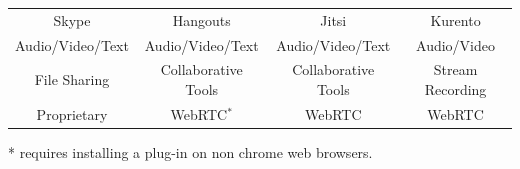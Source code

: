 \documentclass[compress]{beamer}
\begin{document}
\begin{frame}[c]
\begin{table}[]
\begin{tabular}{cccc}
Skype & Hangouts & Jitsi & Kurento   \\
\tiny Audio/Video/Text & \tiny Audio/Video/Text & \tiny Audio/Video/Text & \tiny Audio/Video  \\
\tiny File Sharing & \tiny Collaborative Tools & \tiny Collaborative Tools & \tiny Stream Recording \\
\tiny Proprietary & \tiny WebRTC$^{*}$ & \tiny WebRTC & \tiny WebRTC  
\end{tabular}
\end{table}

	\tiny{* requires installing a plug-in on non chrome web browsers.}
		\end{frame}




\end{document}
